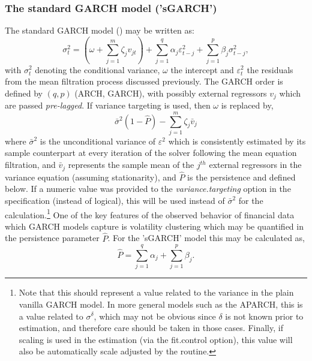 \subsubsection{The standard GARCH model ('sGARCH')}\label{section:sgarch}
The standard GARCH model (\cite{Bollerslev1986}) may be written as:
\begin{equation}\label{eq:sgarch}
\sigma _t^2 = \left( {\omega  + \sum\limits_{j = 1}^m {{\zeta _j}{v_{jt}}} } \right) + \sum\limits_{j = 1}^q {{\alpha _j}\varepsilon _{t - j}^2 + } \sum\limits_{j = 1}^p {{\beta _j}\sigma _{t - j}^2},
\end{equation}
with $\sigma_t^2$ denoting the conditional variance, $\omega$ the intercept
and $\varepsilon_t^2$ the residuals from the mean filtration process discussed
previously. The GARCH order is defined by $(q, p)$ (ARCH, GARCH), with possibly
\verb@m@ external regressors $v_j$ which are passed \emph{pre-lagged}.
If variance targeting is used, then $\omega$ is replaced by,
\begin{equation}\label{eq:sgarchvt}
{{\bar \sigma }^2}\left( {1 - \hat P} \right) - \sum\limits_{j = 1}^m {{\zeta _j}{{\bar v}_j}}
\end{equation}
where ${\bar \sigma}^2$ is the unconditional variance of $\varepsilon^2$ which
is consistently estimated by its sample counterpart at every iteration of the
solver following the mean equation filtration, and ${\bar v}_j$ represents the
sample mean of the $j^{th}$ external regressors in the variance equation
(assuming stationarity), and $\hat P$ is the persistence and defined below. If a
numeric value was provided to the \emph{variance.targeting} option in the specification
(instead of logical), this will be used instead of ${\bar \sigma }^2$ for the
calculation.\footnote{Note that this should represent a value related to the variance
in the plain vanilla GARCH model. In more general models such as the APARCH, this is
a value related to $\sigma^{\delta}$, which may not be obvious since $\delta$ is not
known prior to estimation, and therefore care should be taken in those cases.
Finally, if scaling is  used in the estimation (via the fit.control option), this value will
also be automatically scale adjusted by the routine.}
One of the key features of the observed behavior of financial data which GARCH
models capture is volatility clustering which may be quantified in the
persistence parameter $\hat P$. For the 'sGARCH' model this may be calculated as,
\begin{equation}\label{eq:sgarchp}
\hat P = \sum\limits_{j = 1}^q {{\alpha _j}}  + \sum\limits_{j = 1}^p {{\beta _j}}.
\end{equation}
